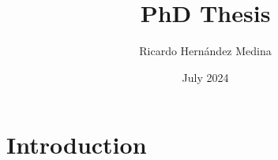 \documentclass{article}
\title{PhD Thesis}
\author{Ricardo Hernández Medina}
\date{July 2024}
\begin{document}
\maketitle

\section{Introduction}
\end{document}
